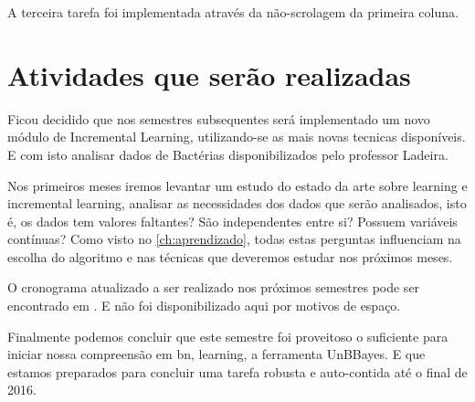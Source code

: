 A terceira tarefa foi implementada através da não-scrolagem da primeira coluna.

\section{Atividades que serão realizadas}
Ficou decidido que nos semestres subsequentes será implementado um novo módulo de Incremental Learning, utilizando-se as mais novas tecnicas disponíveis. 
E com isto analisar dados de Bactérias disponibilizados pelo professor Ladeira.

Nos primeiros meses iremos levantar um estudo do estado da arte sobre learning e incremental learning, analisar as necessidades dos dados que serão analisados, isto é, os dados tem valores faltantes? São independentes entre si? Possuem variáveis contínuas? Como visto no \autoref{ch:aprendizado}, todas estas perguntas influenciam na escolha do algoritmo e nas técnicas que deveremos estudar nos próximos meses.

O cronograma atualizado a ser realizado nos próximos semestres pode ser encontrado em \cite{cronograma}. E não foi disponibilizado aqui por motivos de espaço.

Finalmente podemos concluir que este semestre foi proveitoso o suficiente para iniciar nossa compreensão em \gls{bn}, learning, a ferramenta UnBBayes. E que estamos preparados para concluir uma tarefa robusta e auto-contida até o final de 2016.